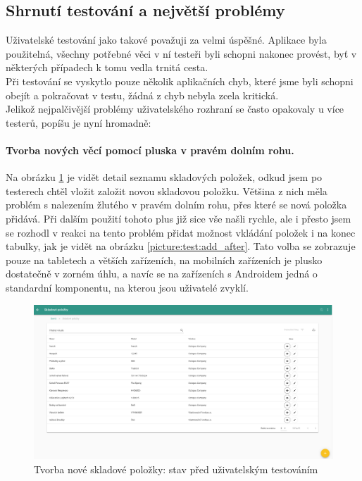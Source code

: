 
\subsection{Shrnutí testování a největší problémy}

Uživatelské testování jako takové považuji za velmi úspěšné. Aplikace byla použitelná, všechny potřebné věci v ní testeři byli schopni nakonec provést, byť v některých případech k tomu vedla trnitá cesta.\\
Při testování se vyskytlo pouze několik aplikačních chyb, které jsme byli schopni obejít a pokračovat v testu, žádná z chyb nebyla zcela kritická.\\

Jelikož nejpalčivější problémy uživatelského rozhraní se často opakovaly u více testerů, popíšu je nyní hromadně:

\paragraph{Tvorba nových věcí pomocí pluska v pravém dolním rohu.} Na obrázku \ref{picture:test:add_before} je vidět detail seznamu skladových položek, odkud jsem po testerech chtěl vložit založit novou skladovou položku. Většina z nich měla problém s nalezením žlutého  v pravém dolním rohu, přes které se nová položka přidává. Při dalším použití tohoto plus již sice vše našli rychle, ale i přesto jsem se rozhodl v reakci na tento problém přidat možnost vkládání položek i na konec tabulky, jak je vidět na obrázku \ref{picture:test:add_after}. Tato volba se zobrazuje pouze na tabletech a větších zařízeních, na mobilních zařízeních je plusko dostatečně v zorném úhlu, a navíc se na zařízeních s Androidem jedná o standardní komponentu, na kterou jsou uživatelé zvyklí.

\begin{figure}[h]
\includegraphics[width=\textwidth]{../png/app_testing/plus_before.png}
\caption{Tvorba nové skladové položky: stav před uživatelským testováním} \label{picture:test:add_before}
\end{figure}

